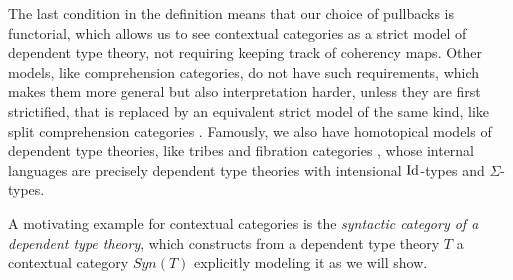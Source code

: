 \begin{rmk}
  The last condition in the definition means that our choice of pullbacks is
  functorial, which allows us to see contextual categories as a strict model of
  dependent type theory, not requiring keeping track of coherency maps.
  Other models, like comprehension categories, do not
  have such requirements, which makes them more general but also
  interpretation harder, unless they are first strictified, that is replaced by
  an equivalent strict model of the same kind, like split comprehension
  categories . Famously, we also have
  homotopical models of dependent type
  theories, like tribes and fibration categories , whose
  internal languages are precisely dependent type theories with intensional
  $\operatorname{Id}$-types and $\Sigma$-types.
\end{rmk}

A motivating example for contextual categories is the \emph{syntactic category
of a dependent type theory}, which constructs from a dependent type theory $T$ a
contextual category $Syn(T)$ explicitly modeling it as we will show.

